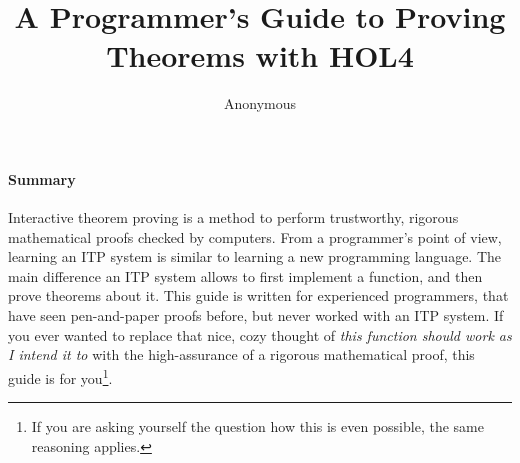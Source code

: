 \documentclass[10pt]{scrartcl}
\title{A Programmer's Guide to Proving Theorems with HOL4}
\author{Anonymous}
\date{}
\begin{document}
\maketitle{}

\paragraph*{Summary}
Interactive theorem proving is a method to perform trustworthy, rigorous
mathematical proofs checked by computers.
From a programmer's point of view, learning an ITP system is similar to
learning a new programming language.
The main difference an ITP system allows to first implement a function,
and then prove theorems about it.
This guide is written for experienced programmers, that have seen pen-and-paper
proofs before, but never worked with an ITP system.
If you ever wanted to replace that nice, cozy thought of \emph{this function
should work as I intend it to} with the high-assurance of a rigorous
mathematical proof, this guide is for you\footnote{If you are asking yourself the question how this is even possible, the same reasoning applies.}.













\printbibliography
\end{document}
